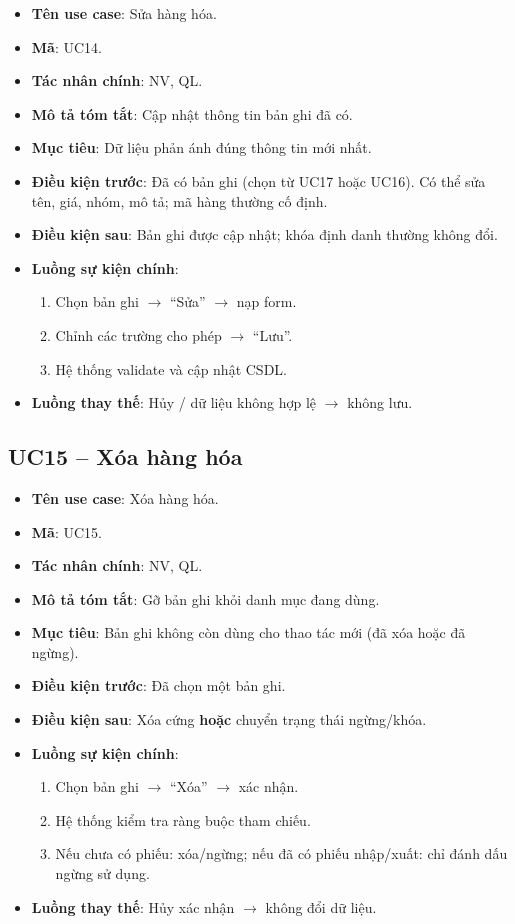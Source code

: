 \begin{itemize}[leftmargin=1.5cm]
    \item \textbf{Tên use case}: Sửa hàng hóa.
    \item \textbf{Mã}: UC14.
    \item \textbf{Tác nhân chính}: NV, QL.
    \item \textbf{Mô tả tóm tắt}: Cập nhật thông tin bản ghi đã có.
    \item \textbf{Mục tiêu}: Dữ liệu phản ánh đúng thông tin mới nhất.
    \item \textbf{Điều kiện trước}: Đã có bản ghi (chọn từ UC17 hoặc UC16). Có thể sửa tên, giá, nhóm, mô tả; mã hàng thường cố định.
    \item \textbf{Điều kiện sau}: Bản ghi được cập nhật; khóa định danh thường không đổi.
    \item \textbf{Luồng sự kiện chính}:
    \begin{enumerate}
        \item Chọn bản ghi $\rightarrow$ ``Sửa'' $\rightarrow$ nạp form.
        \item Chỉnh các trường cho phép $\rightarrow$ ``Lưu''.
        \item Hệ thống validate và cập nhật CSDL.
    \end{enumerate}
    \item \textbf{Luồng thay thế}: Hủy / dữ liệu không hợp lệ $\rightarrow$ không lưu.
\end{itemize}


\subsection{UC15 -- Xóa hàng hóa}

\begin{itemize}[leftmargin=1.5cm]
    \item \textbf{Tên use case}: Xóa hàng hóa.
    \item \textbf{Mã}: UC15.
    \item \textbf{Tác nhân chính}: NV, QL.
    \item \textbf{Mô tả tóm tắt}: Gỡ bản ghi khỏi danh mục đang dùng.
    \item \textbf{Mục tiêu}: Bản ghi không còn dùng cho thao tác mới (đã xóa hoặc đã ngừng).
    \item \textbf{Điều kiện trước}: Đã chọn một bản ghi.
    \item \textbf{Điều kiện sau}: Xóa cứng \textbf{hoặc} chuyển trạng thái ngừng/khóa.
    \item \textbf{Luồng sự kiện chính}:
    \begin{enumerate}
        \item Chọn bản ghi $\rightarrow$ ``Xóa'' $\rightarrow$ xác nhận.
        \item Hệ thống kiểm tra ràng buộc tham chiếu.
        \item Nếu chưa có phiếu: xóa/ngừng; nếu đã có phiếu nhập/xuất: chỉ đánh dấu ngừng sử dụng.
    \end{enumerate}
    \item \textbf{Luồng thay thế}: Hủy xác nhận $\rightarrow$ không đổi dữ liệu.
\end{itemize}


